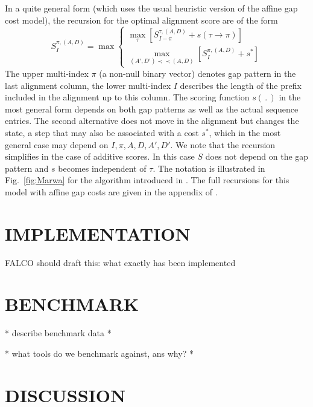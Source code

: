 \documentclass[a4paper,10pt]{article}
\newcommand{\TODO}[1]{\begingroup\color{red}#1\endgroup}
\newcommand{\pprec}{\mathrel{\prec\!\!\!\prec}}
\begin{document}
In a quite general form (which uses the usual heuristic version of the
affine gap cost model), the recursion for the optimal alignment score are
of the form
\begin{equation} 
  S^{\pi,(A,D)}_I = \max 
      \begin{cases}
        \displaystyle\max_{\tau} 
            \left[ S^{\tau,(A,D)}_{I-\pi} + s(\tau\to\pi)
                    \right]
        \\
        \displaystyle\max_{(A',D')\pprec(A,D)}  
                    \left[ S^{\pi,(A,D)}_I + s^*\right]
       \end{cases} 
\label{eq:maxrec}
\end{equation}
The upper multi-index $\pi$ (a non-null binary vector) denotes gap pattern
in the last alignment column, the lower multi-index $I$ describes the
length of the prefix included in the alignment up to this column. The
scoring function $s(\,.\,)$ in the most general form depends on both gap
patterns as well as the actual sequence entries. The second alternative
does not move in the alignment but changes the state, a step that may also
be associated with a cost $s^*$, which in the most general case may depend
on $I,\pi,A,D,A',D'$.  We note that the recursion simplifies in the case of
additive scores. In this case $S$ does not depend on the gap pattern and
$s$ becomes independent of $\tau$. The notation is illustrated in
Fig.~\ref{fig:Marwa} for the algorithm introduced in \cite{AlArab:17a}.
The full recursions for this model with affine gap costs are given in the
appendix of \cite{Retzlaff:18a}.


\section{\uppercase{Implementation}}

\TODO{FALCO should draft this: what exactly has been implemented} 


\section{\uppercase{Benchmark}}

\TODO{* describe benchmark data *}

\TODO{* what tools do we benchmark against, ans why? *} 


\section{\uppercase{Discussion}}
\end{document}

